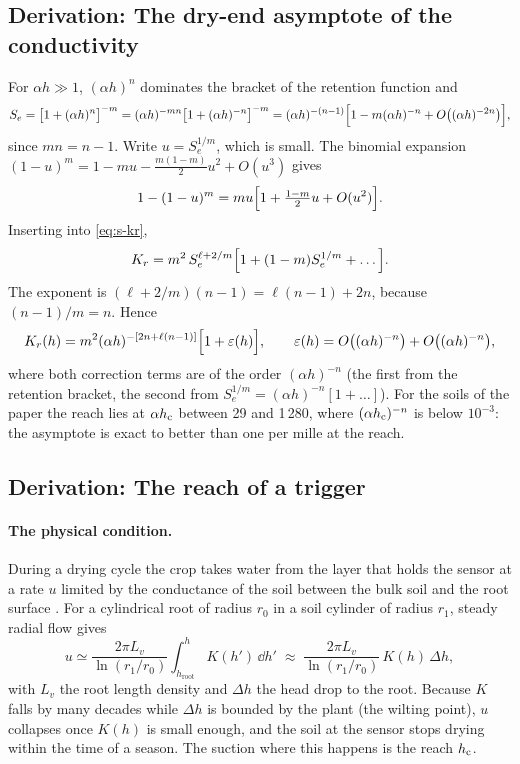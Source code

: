 \subsection{Derivation: The dry-end asymptote of the conductivity}\label{der:s4:2}
For $\alpha h\gg1$, $(\alpha h)^n$ dominates the bracket of the retention function and
\begin{equation}
S_e=\bigl[1+(\alpha h)^n\bigr]^{-m}=(\alpha h)^{-mn}\bigl[1+(\alpha h)^{-n}\bigr]^{-m}=(\alpha h)^{-(n-1)}\Bigl[1-m(\alpha h)^{-n}+O\bigl((\alpha h)^{-2n}\bigr)\Bigr],
\end{equation}
since $mn=n-1$. Write $u=S_e^{1/m}$, which is small. The binomial expansion $(1-u)^{m}=1-mu-\tfrac{m(1-m)}{2}u^2+O(u^3)$ gives
\begin{equation}
1-(1-u)^{m}=mu\Bigl[1+\tfrac{1-m}{2}u+O(u^2)\Bigr].
\end{equation}
Inserting into \cref{eq:s-kr},
\begin{equation}
K_r=m^{2}\,S_e^{\ell+2/m}\Bigl[1+(1-m)S_e^{1/m}+\dots\Bigr].
\end{equation}
The exponent is $(\ell+2/m)(n-1)=\ell(n-1)+2n$, because $(n-1)/m=n$. Hence
\begin{equation}
K_r(h)=m^{2}(\alpha h)^{-[2n+\ell(n-1)]}\Bigl[1+\varepsilon(h)\Bigr],\qquad \varepsilon(h)=O\bigl((\alpha h)^{-n}\bigr)+O\bigl((\alpha h)^{-n}\bigr), \label{eq:s-asym}
\end{equation}
where both correction terms are of the order $(\alpha h)^{-n}$ (the first from the retention bracket, the second from $S_e^{1/m}=(\alpha h)^{-n}[1+\dots]$). For the soils of the paper the reach lies at $\alpha h_{\mathrm{c}}$ between 29 and 1\,280, where $(\alpha h_{\mathrm{c}})^{-n}$ is below $10^{-3}$: the asymptote is exact to better than one per mille at the reach.


\subsection{Derivation: The reach of a trigger}\label{der:s4:3}
\paragraph{The physical condition.} During a drying cycle the crop takes water from the layer that holds the sensor at a rate $u$ limited by the conductance of the soil between the bulk soil and the root surface \citep{Gardner1960}. For a cylindrical root of radius $r_0$ in a soil cylinder of radius $r_1$, steady radial flow gives
\begin{equation}
u\simeq\frac{2\pi L_v}{\ln(r_1/r_0)}\int_{h_{\mathrm{root}}}^{h}K(h')\,\dd h' \;\approx\; \frac{2\pi L_v}{\ln(r_1/r_0)}\,K(h)\,\Delta h,
\end{equation}
with $L_v$ the root length density and $\Delta h$ the head drop to the root. Because $K$ falls by many decades while $\Delta h$ is bounded by the plant (the wilting point), $u$ collapses once $K(h)$ is small enough, and the soil at the sensor stops drying within the time of a season. The suction where this happens is the reach $h_{\mathrm{c}}$.
